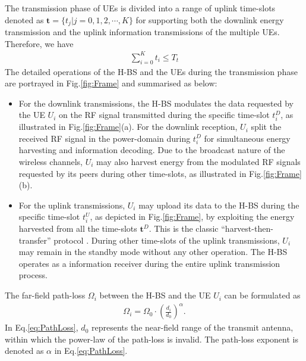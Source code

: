 \documentclass[12pt,draft,onecolumn,journal]{IEEEtran}
\begin{document}
The transmission phase of UEs is divided into a range of uplink time-slots denoted as $\mathbf{t} = \{t_j | j=0, 1,2,\cdots, K\}$ for supporting both the downlink energy transmission and the uplink information transmissions of the multiple UEs. Therefore, we have
\begin{align}
\sum_{i=0}^{K} t_i \leq T_t
\end{align}
The detailed operations of the H-BS and the UEs during the transmission phase are portrayed in Fig.\ref{fig:Frame} and summarised as below:
\begin{itemize}
	\item For the downlink transmissions, the H-BS modulates the data requested by the UE $U_i$ on the RF signal transmitted during the specific time-slot $t_i^D$, as illustrated in Fig.\ref{fig:Frame}(a). For the downlink reception, $U_i$ split the received RF signal in the power-domain during $t_i^D$ for simultaneous energy harvesting and information decoding. Due to the broadcast nature of the wireless channels, $U_i$ may also harvest energy from the modulated RF signals requested by its peers during other time-slots, as illustrated in Fig.\ref{fig:Frame}(b).
	\item For the uplink transmissions, $U_i$ may upload its data to the H-BS during the specific time-slot $t_i^U$, as depicted in Fig.\ref{fig:Frame}, by exploiting the energy harvested from all the time-slots $\mathbf{t}^{D}$. This is the classic ``harvest-then-transfer'' protocol \cite{wpcn_1}. During other time-slots of the uplink transmissions, $U_i$ may remain in the standby mode without any other operation. The H-BS operates as a information receiver during the entire uplink transmission process.
\end{itemize}


The far-field path-loss $\Omega_i$ between the H-BS and the UE $U_i$ can be formulated as
\begin{align}
\Omega_i = \Omega_0 \cdot \left(\frac{d_i}{d_0}\right)^{\alpha}. \label{eq:PathLoss}
\end{align}
In Eq.\eqref{eq:PathLoss}, $d_0$ represents the near-field range of the transmit antenna, within which the power-law of the path-loss is invalid. The path-loss exponent is denoted as $\alpha$ in Eq.\eqref{eq:PathLoss}.
\end{document}
